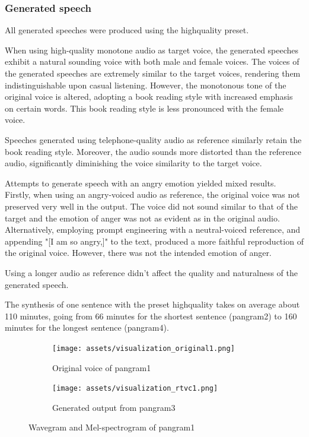 \subsubsection{Generated speech}

All generated speeches were produced using the high\textunderscore quality preset.

When using high-quality monotone audio as target voice, the generated speeches exhibit a natural sounding voice with both male and female voices. The voices of the generated speeches are extremely similar to the target voices, rendering them indistinguishable upon casual listening. However, the monotonous tone of the original voice is altered, adopting a book reading style with increased emphasis on certain words. This book reading style is less pronounced with the female voice.

Speeches generated using telephone-quality audio as reference similarly retain the book reading style. Moreover, the audio sounds more distorted than the reference audio, significantly diminishing the voice similarity to the target voice.

Attempts to generate speech with an angry emotion yielded mixed results. Firstly, when using an angry-voiced audio as reference, the original voice was not preserved very well in the output. The voice did not sound similar to that of the target and the emotion of anger was not as evident as in the original audio. Alternatively, employing prompt engineering with a neutral-voiced reference, and appending "[I am so angry,]" to the text, produced a more faithful reproduction of the original voice. However, there was not the intended emotion of anger.

Using a longer audio as reference didn't affect the quality and naturalness of the generated speech.

The synthesis of one sentence with the preset high\textunderscore quality takes on average about 110 minutes, going from 66 minutes for the shortest sentence (pangram2) to 160 minutes for the longest sentence (pangram4).


\begin{figure}
\centering
\begin{subfigure}{0.49\textwidth}
\centering
\texttt{[image: assets/visualization\_original1.png]}
\caption{Original voice of pangram1}
\label{fig:visualization_original1}
\end{subfigure}
\begin{subfigure}{0.49\textwidth}
\centering
\texttt{[image: assets/visualization\_rtvc1.png]}
\caption{Generated output from pangram3}
\label{fig:visualization_rtvc1}
\end{subfigure}
\caption{Wavegram and Mel-spectrogram of pangram1}
\label{fig:visualization_rtvc}
\end{figure}


